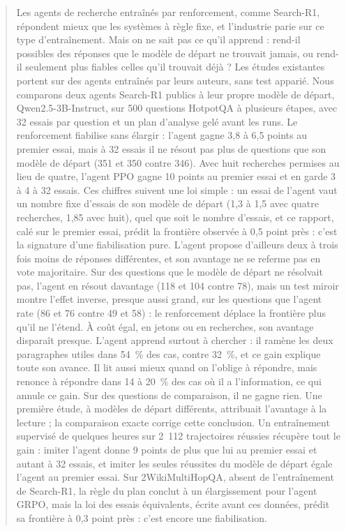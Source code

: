 \begin{abstract}
\noindent Les agents de recherche entraînés par renforcement, comme Search-R1, répondent mieux que les systèmes à règle fixe, et l'industrie parie sur ce type d'entraînement. Mais on ne sait pas ce qu'il apprend : rend-il possibles des réponses que le modèle de départ ne trouvait jamais, ou rend-il seulement plus fiables celles qu'il trouvait déjà ? Les études existantes portent sur des agents entraînés par leurs auteurs, sans test apparié. Nous comparons deux agents Search-R1 publics à leur propre modèle de départ, Qwen2.5-3B-Instruct, sur 500 questions HotpotQA à plusieurs étapes, avec 32 essais par question et un plan d'analyse gelé avant les runs. Le renforcement fiabilise sans élargir : l'agent gagne 3,8 à 6,5 points au premier essai, mais à 32 essais il ne résout pas plus de questions que son modèle de départ (351 et 350 contre 346). Avec huit recherches permises au lieu de quatre, l'agent PPO gagne 10 points au premier essai et en garde 3 à 4 à 32 essais. Ces chiffres suivent une loi simple : un essai de l'agent vaut un nombre fixe d'essais de son modèle de départ (1,3 à 1,5 avec quatre recherches, 1,85 avec huit), quel que soit le nombre d'essais, et ce rapport, calé sur le premier essai, prédit la frontière observée à 0,5 point près : c'est la signature d'une fiabilisation pure. L'agent propose d'ailleurs deux à trois fois moins de réponses différentes, et son avantage ne se referme pas en vote majoritaire. Sur des questions que le modèle de départ ne résolvait pas, l'agent en résout davantage (118 et 104 contre 78), mais un test miroir montre l'effet inverse, presque aussi grand, sur les questions que l'agent rate (86 et 76 contre 49 et 58) : le renforcement déplace la frontière plus qu'il ne l'étend. À coût égal, en jetons ou en recherches, son avantage disparaît presque. L'agent apprend surtout à chercher : il ramène les deux paragraphes utiles dans 54~\% des cas, contre 32~\%, et ce gain explique toute son avance. Il lit aussi mieux quand on l'oblige à répondre, mais renonce à répondre dans 14 à 20~\% des cas où il a l'information, ce qui annule ce gain. Sur des questions de comparaison, il ne gagne rien. Une première étude, à modèles de départ différents, attribuait l'avantage à la lecture ; la comparaison exacte corrige cette conclusion. Un entraînement supervisé de quelques heures sur 2~112 trajectoires réussies récupère tout le gain : imiter l'agent donne 9 points de plus que lui au premier essai et autant à 32 essais, et imiter les seules réussites du modèle de départ égale l'agent au premier essai. Sur 2WikiMultiHopQA, absent de l'entraînement de Search-R1, la règle du plan conclut à un élargissement pour l'agent GRPO, mais la loi des essais équivalents, écrite avant ces données, prédit sa frontière à 0,3 point près : c'est encore une fiabilisation.
\end{abstract}

